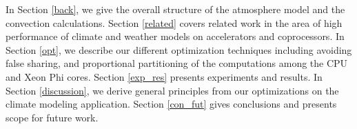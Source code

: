In Section \ref{back}, we give the overall structure of the atmosphere model and the convection calculations.  Section \ref{related} covers related work in the area of high performance of climate and weather models on accelerators and coprocessors. In Section \ref{opt}, we describe our different optimization techniques including avoiding false sharing, and proportional partitioning of the computations among the CPU and Xeon Phi cores. Section \ref{exp_res} presents experiments and results. In Section \ref{discussion}, we derive general principles from our optimizations on the climate modeling application. Section \ref{con_fut} gives conclusions and presents scope for future work.
